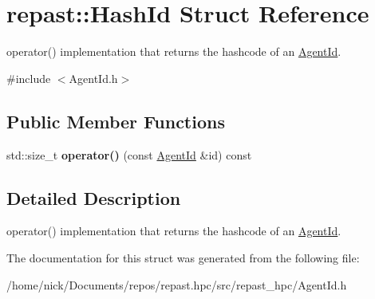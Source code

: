 \hypertarget{structrepast_1_1_hash_id}{\section{repast\-:\-:Hash\-Id Struct Reference}
\label{structrepast_1_1_hash_id}
}


operator() implementation that returns the hashcode of an \hyperlink{classrepast_1_1_agent_id}{Agent\-Id}.  




{\ttfamily \#include $<$Agent\-Id.\-h$>$}

\subsection*{Public Member Functions}
\begin{DoxyCompactItemize}
\item 
\hypertarget{structrepast_1_1_hash_id_a202dfae6a775fc9189f0810a6cdfc329}{std\-::size\-\_\-t {\bfseries operator()} (const \hyperlink{classrepast_1_1_agent_id}{Agent\-Id} \&id) const }\label{structrepast_1_1_hash_id_a202dfae6a775fc9189f0810a6cdfc329}

\end{DoxyCompactItemize}


\subsection{Detailed Description}
operator() implementation that returns the hashcode of an \hyperlink{classrepast_1_1_agent_id}{Agent\-Id}. 

The documentation for this struct was generated from the following file\-:\begin{DoxyCompactItemize}
\item 
/home/nick/\-Documents/repos/repast.\-hpc/src/repast\-\_\-hpc/Agent\-Id.\-h\end{DoxyCompactItemize}
